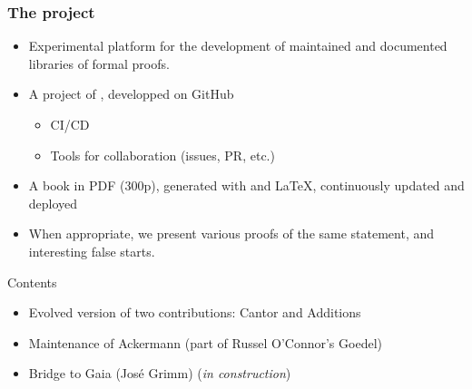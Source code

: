 \documentclass[10pt, fleqn]{beamer}
\begin{document}
\begin{frame}
  \frametitle{The \Hydras project}
  \begin{block}{}
    \begin{itemize}
   \item Experimental platform for the  development of \textcolor{lookcolor}{maintained} and \textcolor{lookcolor}{documented} libraries of formal proofs.
    \item A project of \community, developped on GitHub
      \begin{itemize}
      \item CI/CD
        \item Tools for collaboration (issues, PR, etc.)
        \end{itemize}
      \item A book in PDF (300p), generated  with \textcolor{lookcolor}{\alectr} and \LaTeX, continuously updated and deployed
  \item          When appropriate, we present various proofs of the same statement, and interesting false starts.
    \end{itemize}
  \end{block}
  \begin{block}{Contents}
    \begin{itemize}
    \item Evolved version  of two contributions: \textcolor{plugincolor}{Cantor} and \textcolor{plugincolor}{Additions}
    \item Maintenance of \textcolor{plugincolor}{Ackermann}
      (part of Russel O'Connor's \textcolor{plugincolor}{Goedel})
    \item Bridge to \textcolor{plugincolor}{Gaia} (José Grimm) (\emph{in construction})
   
    \end{itemize}
  \end{block}
 
\end{frame}
\end{document}
